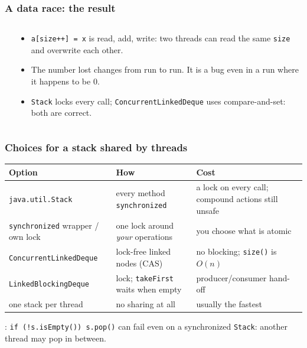 \documentclass[aspectratio=169,10pt,compress]{beamer}
\begin{document}
\begin{frame}[t,fragile] \frametitle{A data race: the result}
  \begin{columns}[T]
    \begin{column}{0.56\textwidth}
    \end{column}
    \begin{column}{0.40\textwidth}
      \begin{itemize}\small
        \item \texttt{a[size++] = x} is read, add, write: two threads can read the same \texttt{size} and overwrite each other.
        \item The number lost changes from run to run. It is a bug even in a run where it happens to be 0.
        \item \texttt{Stack} locks every call; \texttt{ConcurrentLinkedDeque} uses compare-and-set: both are correct.
      \end{itemize}
    \end{column}
  \end{columns}
\end{frame}




\begin{frame}[t,fragile] \frametitle{Choices for a stack shared by threads}
  \begin{center}\footnotesize
  \begin{tabular}{lL{0.28\textwidth}L{0.32\textwidth}}
    \toprule
    \textbf{Option}                          & \textbf{How}                            & \textbf{Cost} \\
    \midrule
    \texttt{java.util.Stack}                 & every method \texttt{synchronized}      & a lock on every call; compound actions still unsafe \\
    \texttt{synchronized} wrapper / own lock & one lock around \emph{your} operations   & you choose what is atomic \\
    \texttt{ConcurrentLinkedDeque}           & lock-free linked nodes (CAS)            & no blocking; \texttt{size()} is $O(n)$ \\
    \texttt{LinkedBlockingDeque}             & lock; \texttt{takeFirst} waits when empty & producer/consumer hand-off \\
    one stack per thread                     & no sharing at all                       & usually the fastest \\
    \bottomrule
  \end{tabular}
  \end{center}
  \small {}: \texttt{if (!s.isEmpty()) s.pop()} can fail even on a synchronized \texttt{Stack}: another thread may pop in between.
\end{frame}
\end{document}
